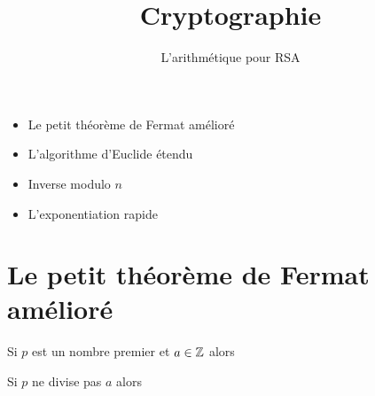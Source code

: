 



\newcommand{\Python}{\texttt{Python}}
\renewcommand{\evidence}[1]{{\color{blue}\textbf{#1}}}

\usepackage{textcomp}

\usepackage{listings}



\newcommand{\codeinline}[1]{\lstinline!#1!}






\title{{\bf Cryptographie}}
\subtitle{L'arithmétique pour RSA}

\begin{frame}
  
  \debutmontitre

  \pause

{\footnotesize
\hfill
{}
\begin{minipage}{0.6\textwidth}
  \begin{itemize}
    \item<3-> Le petit théorème de Fermat amélioré
    \item<4-> L'algorithme d'Euclide étendu
    \item<5-> Inverse modulo $n$
    \item<6-> L'exponentiation rapide
  \end{itemize}
\end{minipage}
}

\end{frame}

\setcounter{framenumber}{0}


\section{Le petit théorème de Fermat amélioré}

\begin{frame}

\begin{theoreme}
Si $p$ est un nombre premier et $a \in \mathbb{Z}$ alors
\end{theoreme}


\pause
\bigskip

\begin{corollaire}
Si $p$ ne divise pas $a$ alors
\end{corollaire}
\end{frame}


